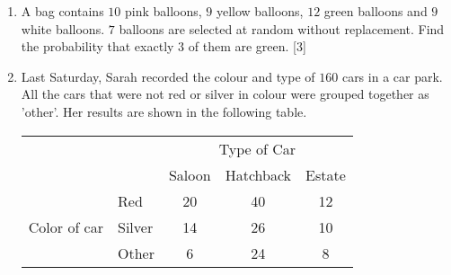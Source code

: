 	\newpage
	
	
	
	\mis     %
	
	\begin{enumerate}
		
		
		
		\item A bag contains $10$ pink balloons, $9$ yellow balloons, $12$ green balloons and $9$ white balloons. $7$ balloons are selected at random without replacement. Find the probability that exactly $3$ of them are green.  \hfill [3]
		
		

\item Last Saturday, Sarah recorded the colour and type of $160$ cars in a car park. All the cars that were not red or silver in colour were grouped together as 'other'. Her results are shown in the following table.

	\begin{table}[!htpb]
		\centering
		\begin{tabular}{ll|ccc|}
			\cline{3-5}
			\multicolumn{1}{c}{}                                &        & \multicolumn{3}{c|}{Type of Car}                                      \\ \cline{3-5} 
			\multicolumn{1}{c}{}                                &        & \multicolumn{1}{c|}{Saloon} & \multicolumn{1}{c|}{Hatchback} & Estate \\ \hline
			\multicolumn{1}{|l|}{\multirow{3}{*}{Color of car}} & Red    & \multicolumn{1}{c|}{20}     & \multicolumn{1}{c|}{40}        & 12     \\ \cline{2-5} 
			\multicolumn{1}{|l|}{}                              & Silver & \multicolumn{1}{c|}{14}     & \multicolumn{1}{c|}{26}        & 10     \\ \cline{2-5} 
			\multicolumn{1}{|l|}{}                              & Other  & \multicolumn{1}{c|}{6}      & \multicolumn{1}{c|}{24}        & 8      \\ \hline
		\end{tabular}
	\end{table}


\end{enumerate}
